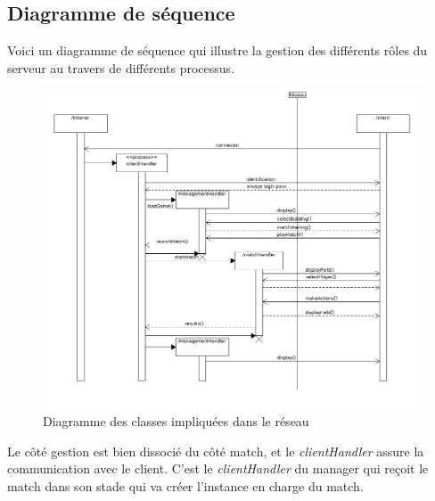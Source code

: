 \documentclass[a4paper,titlepage]{scrreprt}
\begin{document}
  \subsection{Diagramme de séquence}
  Voici un diagramme de séquence qui illustre la gestion des différents
  rôles du serveur au travers de différents processus.
    \begin{figure}[H]
    \center
    \includegraphics[scale=0.4]{uml/class/connexionserveurclient.png}
    \caption{Diagramme des classes impliquées dans le réseau}
    \end{figure}	
  Le côté gestion est bien dissocié du côté match, et le \emph{clientHandler} assure la communication avec le client.
  C'est le \emph{clientHandler} du manager qui reçoit le match dans son stade
  qui va créer l'instance en charge du match.
    

\printindex
\end{document}
